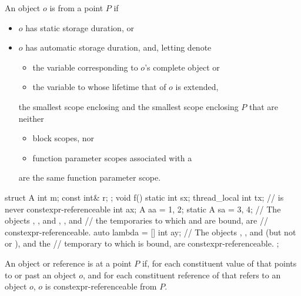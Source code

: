 \documentclass{wg21}
\begin{document}

\begin{addedblock}
An object $o$ is  from a point $P$ if
\begin{itemize}
\item $o$ has static storage duration, or
\item $o$ has automatic storage duration, and, letting  denote
\begin{itemize}
    \item the variable corresponding to $o$’s complete object or
    \item the variable to whose lifetime that of $o$ is extended,
\end{itemize}
the smallest scope enclosing  and the smallest scope enclosing $P$ that
are neither
\begin{itemize}
    \item block scopes, nor
    \item function parameter scopes associated with a
\end{itemize}
are the same function parameter scope.
\end{itemize}
\begin{example}
\begin{codeblock}
struct A {
    int m;
    const int& r;
};
void f() {
    static int sx;
    thread_local int tx;  //  is never constexpr-referenceable
    int ax;
    A aa = {1, 2};
    static A sa = {3, 4};
    // The objects , , and , , and
    // the temporaries to which  and  are bound, are
    // constexpr-referenceable.
    auto lambda = [] {
        int ay;
        // The objects , , and  (but not  or ), and the
        // temporary to which  is bound, are constexpr-referenceable.
    };
}
\end{codeblock}
\end{example}
\end{addedblock}


\begin{addedblock}
An object or reference  is  at a point $P$ if, for each constituent value
of  that points to or past an object $o$, and for each constituent reference of  that refers to an
object $o$, $o$ is constexpr-referenceable from $P$.
\end{addedblock}
\end{document}
